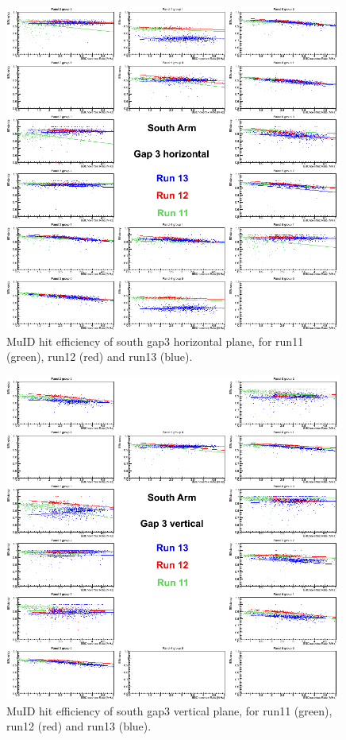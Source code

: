 \begin{center}
  \begin{figure}[p]
    \includegraphics[width=0.99\textwidth]{./figures/efficomp_South_gap3_horizontal.png}
    \caption{\label{Fig:efficiency:MuIdEff:a0g3p0}MuID hit efficiency of south gap3 horizontal plane, for run11 (green), run12 (red) and run13 (blue).}
  \end{figure}
\end{center}
\begin{center}
  \begin{figure}[p]
    \includegraphics[width=0.99\textwidth]{./figures/efficomp_South_gap3_vertical.png}
    \caption{\label{Fig:efficiency:MuIdEff:a0g3p1}MuID hit efficiency of south gap3 vertical plane, for run11 (green), run12 (red) and run13 (blue).}
  \end{figure}
\end{center}

